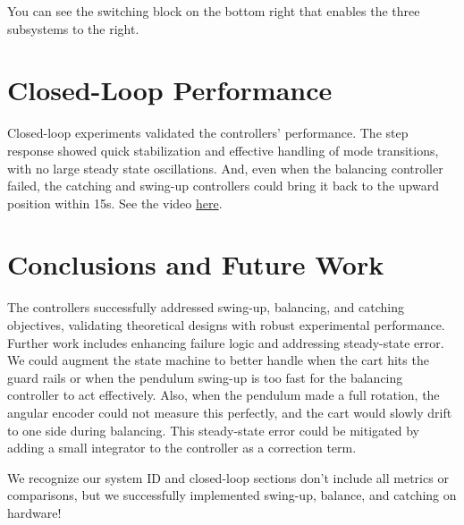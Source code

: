 \documentclass[12pt]{article}
\begin{document}
You can see the switching block on the bottom right that enables the three subsystems to the right.
\section{Closed-Loop Performance}

Closed-loop experiments validated the controllers' performance. The step response showed quick stabilization and effective handling of mode transitions, with no large steady state oscillations. And, even when the balancing controller failed, the catching and swing-up controllers could bring it back to the upward position within 15s. 
See the video \href{https://youtu.be/cFawTXDfmD8}{here}.



\section{Conclusions and Future Work}
The controllers successfully addressed swing-up, balancing, and catching objectives, validating theoretical designs with robust experimental performance. Further work includes enhancing failure logic and addressing steady-state error. 
We could augment the state machine to better handle when the cart hits the guard rails or when the pendulum swing-up is too fast for the balancing controller to act effectively.
Also, when the pendulum made a full rotation, the angular encoder could not measure this perfectly, and the cart would slowly drift to one side during balancing.
This steady-state error could be mitigated by adding a small integrator to the controller as a correction term.

We recognize our system ID and closed-loop sections don't include all metrics or comparisons, but we successfully implemented swing-up, balance, and catching on hardware!

% 
% 
\end{document}
